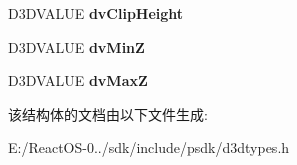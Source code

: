 \begin{DoxyCompactItemize}
\mbox{\label{struct___d3_d_v_i_e_w_p_o_r_t2_a6dfddb47a7499b5951f8071b31fe487d}} 
D3\+D\+V\+A\+L\+UE {\bfseries dv\+Clip\+Height}
\item 
\mbox{\label{struct___d3_d_v_i_e_w_p_o_r_t2_aa2af41ecaafbbb7c4e2fbcf5d4dc3949}} 
D3\+D\+V\+A\+L\+UE {\bfseries dv\+MinZ}
\item 
\mbox{\label{struct___d3_d_v_i_e_w_p_o_r_t2_a47678b5ba491c25fa76d3fe35696578d}} 
D3\+D\+V\+A\+L\+UE {\bfseries dv\+MaxZ}
\end{DoxyCompactItemize}


该结构体的文档由以下文件生成\+:\begin{DoxyCompactItemize}
\item 
E\+:/\+React\+O\+S-\/0../sdk/include/psdk/d3dtypes.\+h\end{DoxyCompactItemize}
